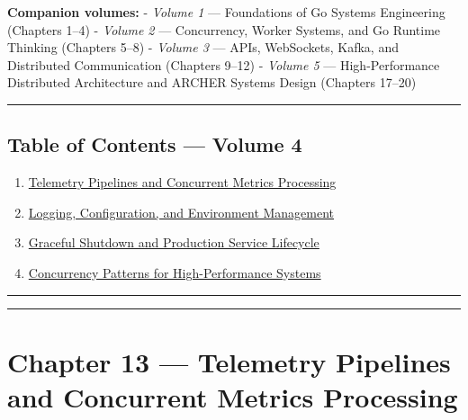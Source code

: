 \documentclass[
]{article}
\providecommand{\tightlist}{%
  \setlength{\itemsep}{0pt}\setlength{\parskip}{0pt}}
\begin{document}
\textbf{Companion volumes:} - \emph{Volume 1} --- Foundations of Go
Systems Engineering (Chapters 1--4) - \emph{Volume 2} --- Concurrency,
Worker Systems, and Go Runtime Thinking (Chapters 5--8) - \emph{Volume
3} --- APIs, WebSockets, Kafka, and Distributed Communication (Chapters
9--12) - \emph{Volume 5} --- High-Performance Distributed Architecture
and ARCHER Systems Design (Chapters 17--20)

\begin{center}\rule{0.5\linewidth}{0.5pt}\end{center}

\hypertarget{table-of-contents-volume-4}{%
\subsection{Table of Contents --- Volume
4}\label{table-of-contents-volume-4}}

\begin{enumerate}
\def\labelenumi{\arabic{enumi}.}
\setcounter{enumi}{12}
\tightlist
\item
  \protect\hyperlink{chapter-13--telemetry-pipelines-and-concurrent-metrics-processing}{Telemetry
  Pipelines and Concurrent Metrics Processing}
\item
  \protect\hyperlink{chapter-14--logging-configuration-and-environment-management}{Logging,
  Configuration, and Environment Management}
\item
  \protect\hyperlink{chapter-15--graceful-shutdown-and-production-service-lifecycle}{Graceful
  Shutdown and Production Service Lifecycle}
\item
  \protect\hyperlink{chapter-16--concurrency-patterns-for-high-performance-systems}{Concurrency
  Patterns for High-Performance Systems}
\end{enumerate}

\begin{center}\rule{0.5\linewidth}{0.5pt}\end{center}

\begin{center}\rule{0.5\linewidth}{0.5pt}\end{center}

\hypertarget{chapter-13-telemetry-pipelines-and-concurrent-metrics-processing}{%
\section{Chapter 13 --- Telemetry Pipelines and Concurrent Metrics
Processing}\label{chapter-13-telemetry-pipelines-and-concurrent-metrics-processing}}
\end{document}
